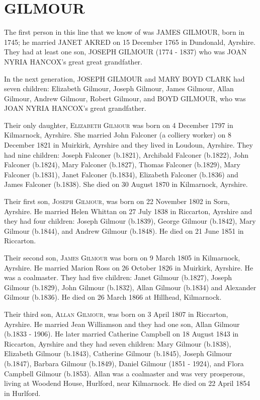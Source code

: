 \section{GILMOUR}

The first person in this line that we know of was \uppercase{James Gilmour}, born in 1745;  he married \uppercase{Janet Akred} on 15 December 1765 in Dundonald, Ayrshire. They had at least one son, \uppercase{Joseph Gilmour} (1774 - 1837) who was \uppercase{Joan Nyria Hancox}'s great great grandfather.

In the next generation, \uppercase{Joseph Gilmour} and \uppercase{Mary Boyd Clark} had seven children: Elizabeth Gilmour, Joseph Gilmour, James Gilmour, Allan Gilmour, Andrew Gilmour, Robert Gilmour, and \uppercase{Boyd Gilmour}, who was \uppercase{Joan Nyria Hancox}'s great grandfather.

Their only daughter, \textsc{Elizabeth Gilmour} was born on 4 December 1797 in Kilmarnock, Ayrshire. She married John Falconer (a colliery worker) on 8 December 1821 in Muirkirk, Ayrshire and they lived in Loudoun, Ayrshire. They had nine children: Joseph Falconer (b.1821), Archibald Falconer (b.1822), John Falconer (b.1824), Mary Falconer (b.1827), Thomas Falconer (b.1829), Mary Falconer (b.1831), Janet Falconer (b.1834), Elizabeth Falconer (b.1836) and James Falconer (b.1838).  She died on 30 August 1870 in Kilmarnock, Ayrshire.

Their first son, \textsc{Joseph Gilmour}, was born on 22 November 1802 in Sorn,	Ayrshire.  He married Helen Whittan on 27 July 1838 in Riccarton, Ayrshire and they had four children: Joseph Gilmour (b.1839),  George Gilmour (b.1842), Mary Gilmour (b.1844), and Andrew Gilmour (b.1848). He died on	21 June 1851 in Riccarton.	

Their second son, \textsc{James Gilmour} was born on 9 March 1805 in Kilmarnock, Ayrshire. He married Marion Ross on 26 October 1826 in Muirkirk, Ayrshire. He was a coalmaster. They had five children: Janet Gilmour (b.1827), Joseph Gilmour (b.1829), John Gilmour (b.1832), Allan Gilmour (b.1834) and Alexander Gilmour (b.1836). He died on 26 March 1866 at Hillhead, Kilmarnock.

Their third son, \textsc{Allan Gilmour}, was born on 3 April 1807 in Riccarton, Ayrshire. He married Jean Williamson and they had one son, Allan Gilmour (b.1833 - 1906).  He later married Catherine Campbell on 18 August 1843 in Riccarton, Ayrshire and they had seven children: Mary Gilmour (b.1838), Elizabeth Gilmour (b.1843), Catherine Gilmour (b.1845), Joseph Gilmour (b.1847), Barbara Gilmour (b.1849), Daniel Gilmour (1851 - 1924), and Flora Campbell Gilmour (b.1853).  Allan was a coalmaster and was very prosperous, living at Woodend House, Hurlford, near Kilmarnock.  He died on 22 April 1854 in Hurlford.

